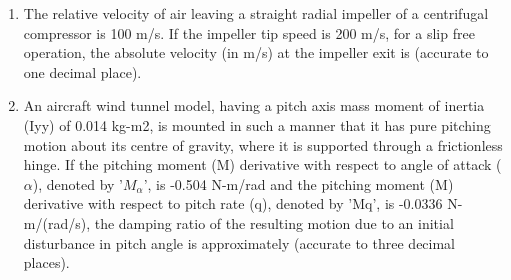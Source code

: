 \documentclass[journal,12pt,onecolumn]{IEEEtran}
\theoremstyle{remark}
\begin{document}
\begin{enumerate}
    \item The relative velocity of air leaving a straight radial impeller of a centrifugal compressor is 100 m/s. If the impeller tip speed is 200 m/s, for a slip free operation, the absolute velocity (in m/s) at the impeller exit is \underline{\hspace{2cm}} (accurate to one decimal place).
    \hfill{}

    \item An aircraft wind tunnel model, having a pitch axis mass moment of inertia (Iyy) of 0.014 kg-m2, is mounted in such a manner that it has pure pitching motion about its centre of gravity, where it is supported through a frictionless hinge. If the pitching moment (M) derivative with respect to angle of attack ($\alpha$), denoted by '$M_{\alpha}$', is -0.504 N-m/rad and the pitching moment (M) derivative with respect to pitch rate (q), denoted by 'Mq', is -0.0336 N-m/(rad/s), the damping ratio of the resulting motion due to an initial disturbance in pitch angle is approximately \underline{\hspace{2cm}} (accurate to three decimal places).
    \hfill{}

\end{enumerate}
\end{document}
